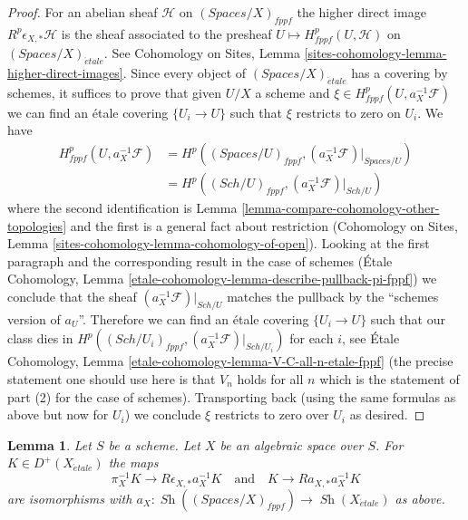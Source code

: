 \documentclass{stacks-project}
\theoremstyle{plain}
\newtheorem{lemma}[subsection]{Lemma}
\theoremstyle{definition}
\theoremstyle{remark}
\numberwithin{equation}{subsection}
\def\Sch{\mathit{Sch}}
\def\Sh{\mathop{\mathit{Sh}}\nolimits}
\def\etale{{\acute{e}tale}}
\begin{document}
\begin{proof}
\medskip\noindent
For an abelian sheaf $\mathcal{H}$ on $(\textit{Spaces}/X)_{fppf}$ the
higher direct image $R^p\epsilon_{X, *}\mathcal{H}$ is the sheaf
associated to the presheaf $U \mapsto H^p_{fppf}(U, \mathcal{H})$
on $(\textit{Spaces}/X)_\etale$. See
Cohomology on Sites, Lemma \ref{sites-cohomology-lemma-higher-direct-images}.
Since every object of $(\textit{Spaces}/X)_\etale$ has a covering
by schemes, it suffices to prove that given $U/X$ a scheme and
$\xi \in H^p_{fppf}(U, a_X^{-1}\mathcal{F})$ we can find
an \'etale covering $\{U_i \to U\}$ such that $\xi$
restricts to zero on $U_i$. We have
\begin{align*}
H^p_{fppf}(U, a_X^{-1}\mathcal{F})
& =
H^p((\textit{Spaces}/U)_{fppf}, (a_X^{-1}\mathcal{F})|_{\textit{Spaces}/U}) \\
& =
H^p((\Sch/U)_{fppf}, (a_X^{-1}\mathcal{F})|_{\Sch/U})
\end{align*}
where the second identification is
Lemma \ref{lemma-compare-cohomology-other-topologies}
and the first is a general fact about restriction
(Cohomology on Sites, Lemma \ref{sites-cohomology-lemma-cohomology-of-open}).
Looking at the first paragraph and the corresponding result in the
case of schemes (\'Etale Cohomology, Lemma
\ref{etale-cohomology-lemma-describe-pullback-pi-fppf})
we conclude that the sheaf $(a_X^{-1}\mathcal{F})|_{\Sch/U}$
matches the pullback by the ``schemes version of $a_U$''.
Therefore we can find an \'etale covering
$\{U_i \to U\}$ such that our class dies in
$H^p((\Sch/U_i)_{fppf}, (a_X^{-1}\mathcal{F})|_{\Sch/U_i})$
for each $i$, see
\'Etale Cohomology, Lemma \ref{etale-cohomology-lemma-V-C-all-n-etale-fppf}
(the precise statement one should use here is that $V_n$ holds for all $n$
which is the statement of part (2) for the case of schemes).
Transporting back (using the same formulas as above but now for
$U_i$) we conclude $\xi$ restricts to zero over $U_i$ as desired.
\end{proof}

\begin{lemma}
\label{lemma-cohomological-descent-etale-fppf}
Let $S$ be a scheme. Let $X$ be an algebraic space over $S$.
For $K \in D^+(X_\etale)$ the maps
$$
\pi_X^{-1}K \longrightarrow R\epsilon_{X, *}a_X^{-1}K
\quad\text{and}\quad
K \longrightarrow Ra_{X, *}a_X^{-1}K
$$
are isomorphisms with
$a_X : \Sh((\textit{Spaces}/X)_{fppf}) \to \Sh(X_\etale)$ as above.
\end{lemma}
\end{document}
